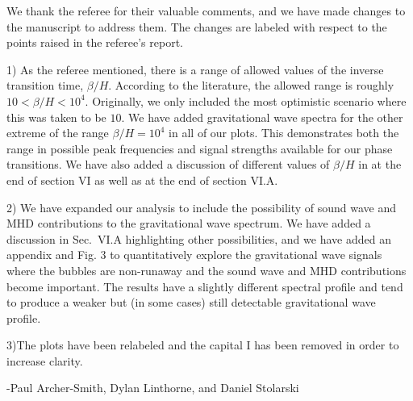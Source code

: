 \documentclass[12pt,letterpaper]{article}
\begin{document}
We thank the referee for their valuable comments, and we have made changes to the manuscript to address them. The changes are labeled with respect to the points raised in the referee's report.

1) As the referee mentioned, there is a range of allowed values of the inverse transition time, $\beta/H$. According to the literature, the allowed range is roughly $10 < \beta/H < 10^4$. Originally, we only included the most optimistic scenario where this was taken to be $10$. We have added gravitational wave spectra for the other extreme of the range $\beta/H = 10^4$ in all of our plots. This demonstrates both the range in possible peak frequencies and signal strengths available for our phase transitions. We have also added a discussion of different values of $\beta/H$ in at the end of section VI as well as at the end of section VI.A.

2) We have expanded our analysis to include the possibility of sound wave and MHD contributions to the gravitational wave spectrum. We have added a discussion in Sec.~VI.A highlighting other possibilities, and we have added an appendix and Fig. 3 to quantitatively explore the gravitational wave signals where the bubbles are non-runaway and the sound wave and MHD contributions become important.  The results have a slightly different spectral profile and tend to produce a weaker but (in some cases) still detectable gravitational wave profile.

3)The plots have been relabeled and the capital I has been removed in order to increase clarity.

-Paul Archer-Smith, Dylan Linthorne, and Daniel Stolarski
\end{document}
